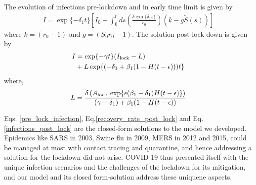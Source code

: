 \documentclass[aps,prl,reprint,superscriptaddress]{revtex4-1}
\begin{document}
The evolution of infections pre-lockdown and in early time limit is given by
\begin{align}
\label{pre_lock_infection}
I = \exp \{ -\delta_1 t \} \left[I_0 +  \int_0^t ds  \left( \frac{ \delta \exp\{ \delta_1 s \}}{ r_0} \right)
\left( k - g\tilde{S}(s) \right) \right]
\end{align}
where $k=(r_0-1)$ and $g=(S_0r_0-1)$. The solution post lock-down is given by
\begin{align}
\label{infections_post_lock}
\begin{split}
I &= \exp \{-\gamma t\}(I_{\rm lock} - L)
\\
& +   L \exp\{ (-\delta_1 + \beta_1(1-{H}(t-\epsilon)))t \}
\end{split}
\end{align}
where, 
\begin{align}
 L =  \frac{\delta \left( A_{\rm lock} \> \exp \{ \epsilon(\beta_1 - \delta_1) {H}(t-\epsilon) \} \right) } {(\gamma-\delta_1)+\beta_1(1-{H}(t-\epsilon))}
\end{align}

Eqs. \eqref{pre_lock_infection}, Eq.\eqref{recovery_rate_post_lock} and Eq.\eqref{infections_post_lock} are the closed-form solutions to the model we developed. Epidemics like SARS in 2003, Swine flu in 2009, MERS in 2012 and 2015, could be managed at most with contact tracing and quarantine, and hence addressing a solution for the lockdown did not arise. COVID-19 thus presented itself with the unique infection scenarios and the challenges of the lockdown for its mitigation, and our model and its closed form-solution address these uniquene aspects.
\end{document}
